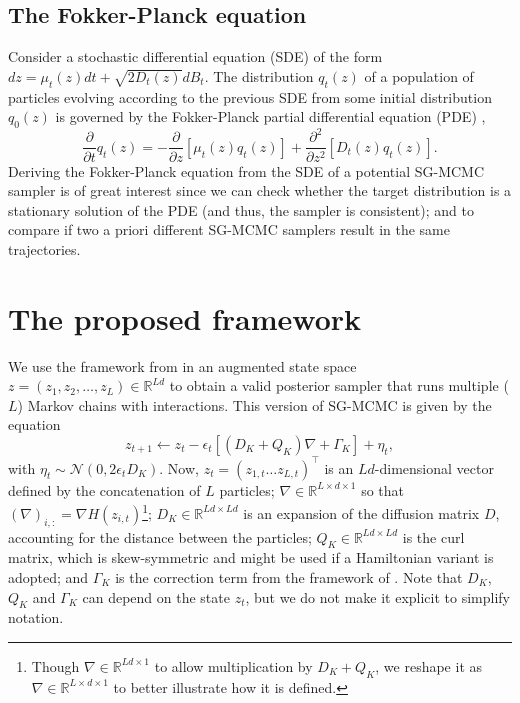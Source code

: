 \subsection{The Fokker-Planck equation}\label{sec:fp}
Consider a stochastic differential equation (SDE) of the form $d{z} = \mu_t({z})dt + \sqrt{2 D_t({z})}dB_t$. The distribution $q_t({z})$ of a population of particles evolving according to the previous SDE from some initial distribution $q_0({z})$ is governed by the Fokker-Planck partial differential equation (PDE) \cite{risken-fpe-1989},
$$
\frac{\partial}{\partial t} q_t({z}) = -\frac{\partial}{\partial {z}} \left[ \mu_t({z}) q_t({z})\right] + \frac{\partial^2}{\partial {z}^2} \left[ D_t({z})q_t({z})\right].
$$
Deriving the Fokker-Planck equation from the SDE of a potential SG-MCMC sampler is of great interest since we can check whether the target distribution is a stationary solution of the PDE (and thus, the sampler is consistent); and to compare if two a priori different SG-MCMC samplers result in the same trajectories.






\section{The proposed framework}\label{sec:framework}

We use the framework from \cite{ma2015complete} in an augmented state space ${z} = \left( {z}_{1}, {z}_{2}, \ldots,{z}_{L}\right) \in \mathbb{R}^{Ld}$ to obtain a valid posterior sampler that runs multiple ($L$) Markov chains with interactions. This version of SG-MCMC is given by the equation
\begin{equation}\label{eq:general}
{z}_{t+1} \leftarrow {z}_t -\epsilon_t \left[ ({{D_K}} + {Q_K}){\nabla} + {\Gamma_K} \right] + {\eta}_t,
\end{equation}
with ${\eta}_t \sim \mathcal{N}({0}, 2\epsilon_t {{D_K}})$.
Now, ${z}_t = \left({z}_{1,t} \ldots  {z}_{L,t} \right)^\top$ is an $Ld$-dimensional vector defined by the concatenation of $L$ particles; ${\nabla} \in \mathbb{R}^{L \times d \times 1}$ so that $({\nabla})_{i,:} = \nabla H({z}_{i,t})$\footnote{Though ${\nabla} \in \mathbb{R}^{L d \times 1}$ to allow multiplication by ${D_K} + {Q_K}$, we reshape it as ${\nabla} \in \mathbb{R}^{L\times d \times 1}$ to better illustrate how it is defined.}; ${D_K} \in \mathbb{R}^{Ld\times Ld}$ is an expansion of the diffusion matrix $D$, accounting for the distance between the particles; ${Q_K} \in \mathbb{R}^{Ld\times Ld}$ is the curl matrix, which is skew-symmetric and might be used if a Hamiltonian variant is adopted; and ${\Gamma_K}$ is the correction term from the framework of \cite{ma2015complete}. Note that ${D_K}$, ${Q_K}$ and ${\Gamma_K}$ can depend on the state ${z}_t$, but we do not make it explicit to simplify notation.

